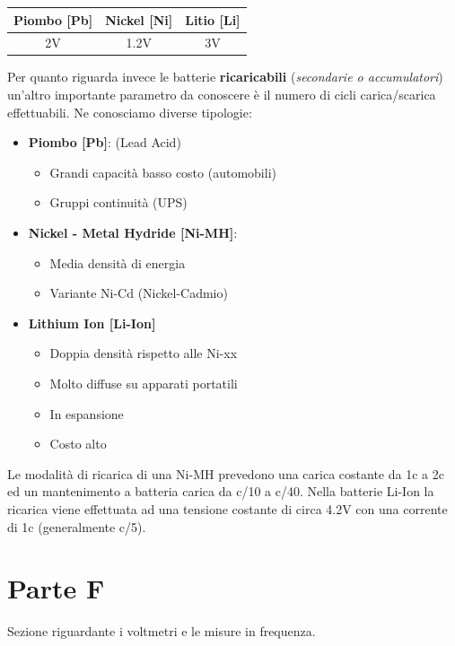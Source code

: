 \documentclass[12pt]{article}
\begin{document}
\begin{center}
\begin{tabular}{ |c|c|c| }
 \hline
 Piombo [Pb] & Nickel [Ni] & Litio [Li] \\
 \hline
 \hline
 2V & 1.2V & 3V \\
 \hline
\end{tabular}
\end{center}

Per quanto riguarda invece le batterie \textbf{ricaricabili} (\textit{secondarie o accumulatori}) un'altro importante parametro da conoscere è il numero di cicli carica/scarica effettuabili. Ne conosciamo diverse tipologie:
\begin{itemize}
  \item \textbf{Piombo [Pb]}: (Lead Acid)
  \begin{itemize}
    \item Grandi capacità basso costo (automobili)
    \item Gruppi continuità (UPS)
  \end{itemize}
  \item \textbf{Nickel - Metal Hydride [Ni-MH]}:
  \begin{itemize}
    \item Media densità di energia
    \item Variante Ni-Cd (Nickel-Cadmio)
  \end{itemize}
  \item \textbf{Lithium Ion [Li-Ion]}
  \begin{itemize}
    \item Doppia densità rispetto alle Ni-xx
    \item Molto diffuse su apparati portatili
    \item In espansione
    \item Costo alto
  \end{itemize}
\end{itemize}

Le modalità di ricarica di una Ni-MH prevedono una carica costante da 1c a 2c ed un mantenimento a batteria carica da c/10 a c/40. Nella batterie Li-Ion la ricarica viene effettuata ad una tensione costante di circa 4.2V con una corrente di 1c (generalmente c/5).

\section{Parte F}\label{F}
Sezione riguardante i voltmetri e le misure in frequenza.
\end{document}
